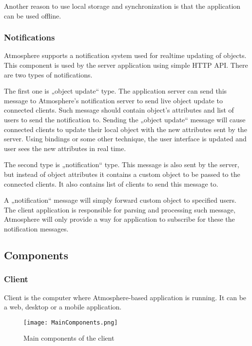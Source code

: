 Another reason to use local storage and synchronization is that the application can be used offline.

\subsubsection{Notifications}

Atmosphere supports a notification system used for realtime updating of objects. This component is used by the server application using simple HTTP API. There are two types of notifications.

The first one is „object update“ type. The application server can send this  message to Atmosphere’s notification server to send live object update to connected clients. Such message should contain object’s attributes and list of users to send the notification to. Sending the „object update“ message will cause connected clients to update their local object with the new attributes sent by the server. Using bindings or some other technique, the user interface is updated and user sees the new attributes in real time.

The second type is „notification“ type. This message is also sent by the server, but instead of object attributes it contains a custom object to be passed to the connected clients. It also contains list of clients to send this message to. 

A „notification“ message will simply forward custom object to specified users. The client application is responsible for parsing and processing such message, Atmosphere will only provide a way for application to subscribe for these the notification messages. 

\subsection{Components}

\subsubsection{Client}

Client is the computer where Atmosphere-based application is running. It can be a web, desktop or a mobile application.

\begin{figure}[ht!]
\centering
\texttt{[image: MainComponents.png]}
\caption{Main components of the client \label{fig:3}}
\end{figure}

